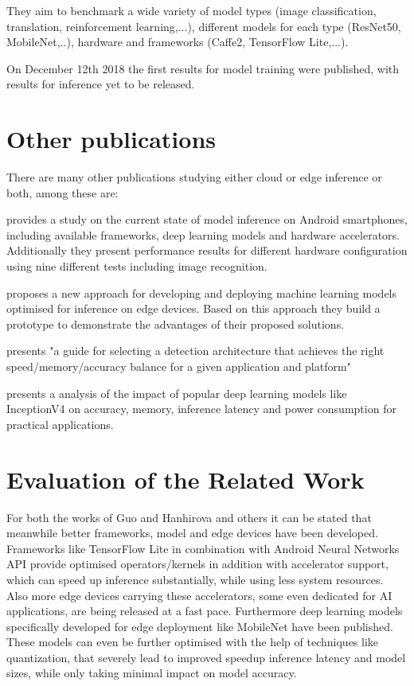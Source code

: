 They aim to benchmark a wide variety of model types (image classification, translation, reinforcement learning,...), different models for each type (ResNet50, MobileNet,..), hardware and frameworks (Caffe2, TensorFlow Lite,...).

On December 12th 2018 the first results for model training were published, with results for inference yet to be released.

\section{Other publications}
There are many other publications studying either cloud or edge inference or both, among these are:



\cite{DBLP:journals/corr/abs-1810-01109} provides a study on the current state of model inference on Android smartphones, including available frameworks, deep learning models and hardware accelerators. Additionally they present performance results for different hardware configuration using nine different tests including image recognition.

\cite{rethinkingDeployment} proposes a new approach for developing and deploying machine learning models optimised for inference on edge devices. Based on this approach they build a prototype to demonstrate the advantages of their proposed solutions.


\cite{DBLP:journals/corr/HuangRSZKFFWSG016} presents "a guide for selecting a detection architecture that achieves the right
speed/memory/accuracy balance for a given application and platform"

\cite{DBLP:journals/corr/CanzianiPC16} presents a analysis of the impact of popular deep learning models like InceptionV4 on accuracy, memory, inference latency and power consumption for practical applications.
\section{Evaluation of the Related Work}
For both the works of Guo\cite{DBLP:conf/ic2e/Guo18} and Hanhirova and others\cite{DBLP:conf/mmsys/HanhirovaKSSHY18} it can be stated that meanwhile better frameworks, model and edge devices have been developed.
Frameworks like TensorFlow Lite in combination with Android Neural Networks API provide optimised operators/kernels in addition with accelerator support, which can speed up inference substantially, while using less system resources.
Also more edge devices carrying these accelerators, some even dedicated for AI applications, are being released at a fast pace.
Furthermore deep learning models specifically developed for edge deployment like MobileNet have been published. These models can even be further optimised with the help of techniques like quantization, that severely lead to improved speedup inference latency and model sizes, while only taking minimal impact on model accuracy.

